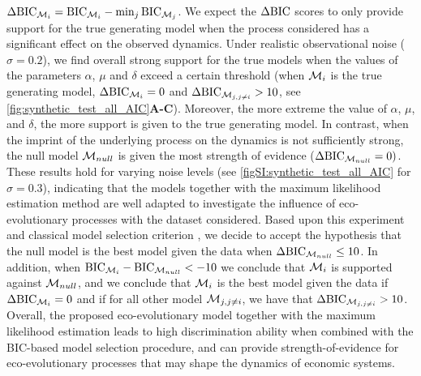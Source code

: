 %
$\Delta \text{BIC}_{\mathcal{M}_i} = \text{BIC}_{\mathcal{M}_i} - \min_{j} \text{BIC}_{\mathcal{M}_j}$. 
%
We expect the $\Delta \text{BIC}$ scores to only provide support for the true generating model when the process considered has a significant effect on the observed dynamics.
Under realistic observational noise ($\sigma = 0.2$), we find overall strong support for the true models when the values of the parameters $\alpha$, $\mu$ and $\delta$ exceed a certain threshold (when $\mathcal{M}_i$ is the true generating model, $\Delta\text{BIC}_{\mathcal{M}_{i}} = 0$ and $\Delta\text{BIC}_{\mathcal{M}_{j,j\neq i}} > 10$, see \cref{fig:synthetic_test_all_AIC}\textbf{A-C}). 
% 
% 
% 
Moreover, the more extreme the value of $\alpha$, $\mu$, and $\delta$, the more support is given to the true generating model.
% 
In contrast, when the imprint of the underlying process on the dynamics is not sufficiently strong, the null model $\mathcal{M}_{null}$ is given the most strength of evidence ($\Delta\text{BIC}_{\mathcal{M}_{null}} = 0)$.
% 
% 
These results hold for varying noise levels (see \cref{figSI:synthetic_test_all_AIC} for $\sigma = 0.3$), indicating that the models together with the maximum likelihood estimation method are well adapted to investigate the influence of eco-evolutionary processes with the dataset considered.
%
Based upon this experiment and classical model selection criterion \citep{Burnham2002}, we decide to accept the hypothesis that the null model is the best model given the data when $\Delta \text{BIC}_{\mathcal{M}_{null}} \leq 10$. In addition, when $\text{BIC}_{\mathcal{M}_i} - \text{BIC}_{\mathcal{M}_{null}} < -10$ we conclude that $\mathcal{M}_i$ is supported against $\mathcal{M}_{null}$, and we conclude that $\mathcal{M}_i$ is the best model given the data if $\Delta \text{BIC}_{\mathcal{M}_i} = 0 $ and if for all other model $\mathcal{M}_{j,j \neq i}$, we have that $\Delta \text{BIC}_{\mathcal{M}_{j,j \neq i}} > 10$.
Overall, the proposed eco-evolutionary model together with the maximum likelihood estimation leads to high discrimination ability when combined with the BIC-based model selection procedure, and can provide strength-of-evidence for eco-evolutionary processes that may shape the dynamics of economic systems.

